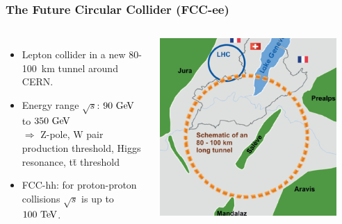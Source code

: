\begin{frame}
  \frametitle{The Future Circular Collider (FCC-ee)}

  \begin{columns}

    \begin{itemize}
    \item Lepton collider in a new 80-100~km tunnel around CERN.
    \item Energy range $\sqrt{s}$: \textcolor{Green}{$90\,\mathrm{\,Ge\kern -0.1em V}$} to
      \textcolor{Green}{$350\,\mathrm{\,Ge\kern -0.1em V}$} \\
      $\Rightarrow$ Z-pole, W pair production threshold, Higgs
      resonance, t\={t} threshold
    \item FCC-hh: for proton-proton collisions $\sqrt{s}$ is up to $100\,\mathrm{\,Te\kern -0.1em V}$.
    \end{itemize}

    \centering
    \includegraphics[width=0.9\textwidth]{figures/FCC}

  \end{columns}

\end{frame}

